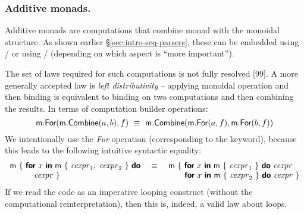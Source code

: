 \documentclass[runningheads,a4paper]{llncs}
\begin{document}
\subsubsection{Additive monads.} Additive monads are computations that combine monad with 
the monoidal structure. As shown earlier \S\ref{sec:intro-seq-parsers}, these can be embedded
using / or using / (depending on which 
aspect is ``more important'').

The set of laws required for such computations is not fully resolved [99]. A more generally 
accepted law is \emph{left distributivity} -- applying monoidal operation and then binding is equivalent
to binding on two computations and then combining the results. In terms of computation builder
operations:
%
\begin{equation*}
\textnormal{\sffamily m}.\textnormal{\sffamily For}(\textnormal{\sffamily m}.\textnormal{\sffamily Combine}(a, b), f)
~\equiv~
\textnormal{\sffamily m}.\textnormal{\sffamily Combine}(\textnormal{\sffamily m}.\textnormal{\sffamily For}(a, f), \textnormal{\sffamily m}.\textnormal{\sffamily For}(b, f))
\end{equation*}
%
We intentionally use the \emph{For} operation (corresponding to the  keyword), because
this leads to the following intuitive syntactic equality:
%
\begin{equation*}
\begin{array}{l}
\textnormal{\sffamily m}~\{~  \textnormal{\bfseries\sffamily for}~x~\textnormal{\bfseries\sffamily in}~\textnormal{\sffamily m}~\{~\textnormal{\emph{cexpr}}_1;\;\textnormal{\emph{cexpr}}_2~\}~\textnormal{\bfseries\sffamily do}\\
\hspace{2.0em}\quad \textnormal{\emph{cexpr}}~\}
\end{array}~
\begin{array}{c}\equiv\\~\end{array}~
\begin{array}{l}
\textnormal{\sffamily m}~\{~ \textnormal{\bfseries\sffamily for}~x~\textnormal{\bfseries\sffamily in}~\textnormal{\sffamily m}~\{~\textnormal{\emph{cexpr}}_1~\}~\textnormal{\bfseries\sffamily do}~\textnormal{\emph{cexpr}} \\
\hspace{2em}  \textnormal{\bfseries\sffamily for}~x~\textnormal{\bfseries\sffamily in}~\textnormal{\sffamily m}~\{~\textnormal{\emph{cexpr}}_2~\}~\textnormal{\bfseries\sffamily do}~\textnormal{\emph{cexpr}}~\}
\end{array}
\end{equation*}
%
If we read the code as an imperative looping construct (without the computational reinterpretation),
then this is, indeed, a valid law about  loops.
\end{document}

